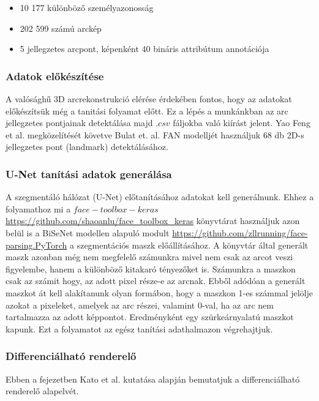 \documentclass[12pt,a4]{article}
\begin{document}
    \begin{itemize}
        \item 10 177 különböző személyazonosság
        \item 202 599 számú arckép
        \item 5 jellegzetes arcpont, képenként 40 bináris attribútum annotációja
    \end{itemize}

    
	\subsubsection{Adatok előkészítése}

   A valósághű 3D arcrekonstrukció elérése érdekében fontos, hogy az adatokat előkészítsük még a tanitási folyamat előtt. Ez a lépés a munkánkban az arc jellegzetes pontjainak detektálása majd $.csv$ fáljokba való kiírást jelent. Yao Feng et al. \cite{deca} megközelítését követve Bulat et. al. \cite{bulat} FAN modelljét használjuk 68 db 2D-s jellegzetes pont (landmark) detektálásához.
   
    \subsubsection{U-Net tanítási adatok generálása}

    A szegmentáló hálózat (U-Net) előtanításához adatokat kell generálnunk. Ehhez a folyamathoz mi a $face-toolbox-keras$ \url{https://github.com/shaoanlu/face_toolbox_keras} könyvtárat használjuk azon belül is a BiSeNet modellen alapuló modult \url{https://github.com/zllrunning/face-parsing.PyTorch} a szegmentációs maszk előállításához. A könyvtár által generált maszk azonban még nem megfelelő számunkra mivel nem csak az arcot veszi figyelembe, hanem a különböző kitakaró tényezőket is. Számunkra a maszkon csak az számit hogy, az adott pixel része-e az arcnak. Ebből adódóan a generált maszkot át kell alakítanunk olyan formábon, hogy a maszkon 1-es számmal jelölje azokat a pixeleket, amelyek az arc részei, valamint 0-val, ha az arc nem tartalmazza az adott képpontot. Eredményként egy szürkeárnyalatú maszkot kapunk. Ezt a folyamatot az egész tanítási adathalmazon végrehajtjuk. 
    
    \subsubsection{Differenciálható renderelő}

    Ebben a fejezetben Kato et al. \cite{diffrenderer} kutatása alapján bemutatjuk a differenciálható renderelő alapelvét.
\end{document}
